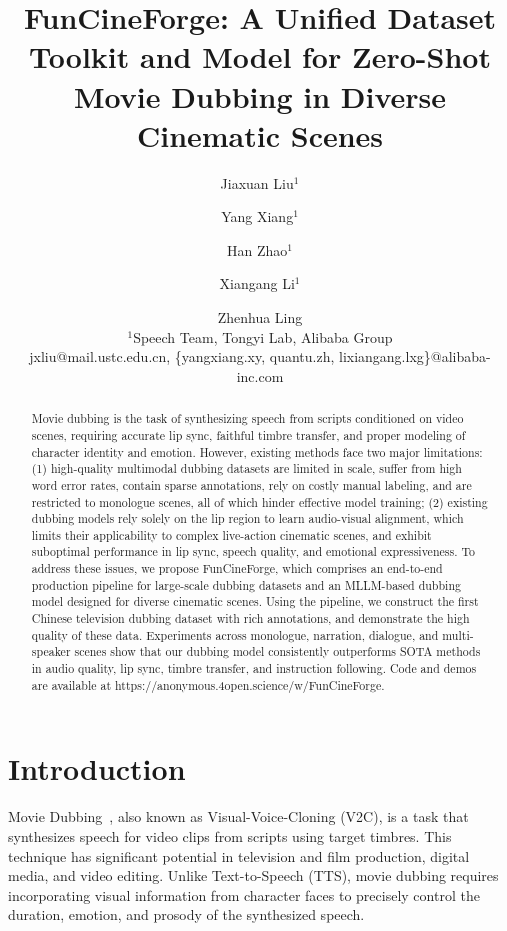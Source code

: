 \documentclass{article}
\title{FunCineForge: A Unified Dataset Toolkit and Model for Zero-Shot Movie Dubbing in Diverse Cinematic Scenes}
\author{
Jiaxuan Liu$^1$\and
Yang Xiang$^1$\and
Han Zhao$^1$\and
Xiangang Li$^1$\and
Zhenhua Ling\\
\affiliations
$^1$Speech Team, Tongyi Lab, Alibaba Group\\
\emails
jxliu@mail.ustc.edu.cn, \{yangxiang.xy, quantu.zh, lixiangang.lxg\}@alibaba-inc.com
}
\begin{document}
\maketitle

\begin{abstract}
    Movie dubbing is the task of synthesizing speech from scripts conditioned on video scenes,
    requiring accurate lip sync, faithful timbre transfer, and proper modeling of character identity and emotion.
    However, existing methods face two major limitations: 
    (1) high-quality multimodal dubbing datasets are limited in scale, suffer from high word error rates, contain sparse annotations, 
    rely on costly manual labeling, and are restricted to monologue scenes,
    all of which hinder effective model training;
    (2) existing dubbing models rely solely on the lip region to learn audio-visual alignment, 
    which limits their applicability to complex live-action cinematic scenes,
    and exhibit suboptimal performance in lip sync, speech quality, and emotional expressiveness.
    To address these issues, we propose FunCineForge, 
    which comprises an end-to-end production pipeline for large-scale dubbing datasets 
    and an MLLM-based dubbing model designed for diverse cinematic scenes.
    Using the pipeline, we construct the first Chinese television dubbing dataset with rich annotations, 
    and demonstrate the high quality of these data. 
    Experiments across monologue, narration, dialogue, and multi-speaker scenes show that 
    our dubbing model consistently outperforms SOTA methods in audio quality, lip sync, timbre transfer, and instruction following.
    Code and demos are available at https://anonymous.4open.science/w/FunCineForge.
\end{abstract}

\section{Introduction}
Movie Dubbing~\cite{V2C}, also known as Visual-Voice-Cloning (V2C), 
is a task that synthesizes speech for video clips from scripts using target timbres. 
This technique has significant potential in television and film production, digital media, and video editing.
Unlike Text-to-Speech (TTS), movie dubbing requires incorporating visual information from character faces to precisely control the duration, emotion, and prosody of the synthesized speech.
\end{document}
